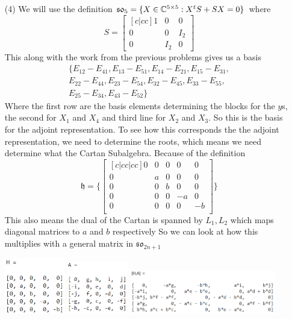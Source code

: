 \documentclass[12pt]{amsart}
\begin{document}
\begin{itemize}
    \item[(4)] %
    We will use the definition $\mathfrak{s0}_{5}=\{X\in \mathbb{C}^{5\times 5}: X^tS+SX=0\}$ where 
    \[S=\begin{bmatrix}[c|cc]
        1 &0 &0\\
        \hline
        0 &0 &I_2\\
        0 &I_2& 0
    \end{bmatrix}\]
    This along with the work from the previous problems gives us a basis 
    \begin{equation*}
        \begin{split}
        \{E_{12}-E_{41},E_{13}-E_{51}, E_{14}-E_{21}, E_{15}-E_{31},\\ %
        E_{22}-E_{44}, E_{23}-E_{54}, E_{32}-E_{45}, E_{33}-E_{55},\\ %
        E_{25}-E_{34}, E_{43}-E_{52}
        \}
        \end{split}
    \end{equation*}
    Where the first row are the basis elements determining the blocks for the $y$s, the second for 
    $X_1$ and $X_4$ and third line for $X_2$ and $X_3$. So this is the basis for the adjoint representation.
    To see how this corresponds the the adjoint representation, we need to determine the roots, 
    which means we need determine what the Cartan Subalgebra. Because of the definition 
    \[\mathfrak{h}=\{\begin{bmatrix}[c|cc|cc]
        0&0&0&0&0\\
        \hline
        0&a&0&0&0\\
        0&0&b&0&0\\
        \hline
        0&0&0&-a&0\\
        0&0&0&0&-b\\
    \end{bmatrix}\}\]
    This also means the dual of the Cartan is spanned by $L_1,L_2$ which maps diagonal 
    matrices to $a$ and $b$ respectively 
    So we can look at how this multiplies with a general matrix in $\mathfrak{so}_{2n+1}$

    \includegraphics[width=100px]{hw6-1.png}
    \includegraphics[width=100px]{hw6-2.png}
    \includegraphics[width=240px]{hw6-3.png}
    

\end{itemize}
\end{document}
